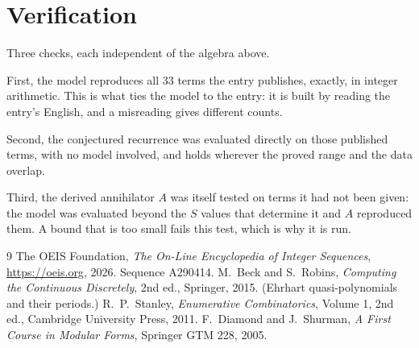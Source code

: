 \documentclass[11pt,a4paper]{article}
\theoremstyle{plain}
\theoremstyle{definition}
\begin{document}
\section{Verification}

Three checks, each independent of the algebra above.

First, the model reproduces all $33$ terms the entry publishes, exactly, in integer
arithmetic. This is what ties the model to the entry: it is built by reading the entry's
English, and a misreading gives different counts.

Second, the conjectured recurrence was evaluated directly on those published terms, with no
model involved, and holds wherever the proved range and the data overlap.

Third, the derived annihilator $A$ was itself tested on terms it had not been given: the model
was evaluated beyond the $S$ values that determine it and $A$ reproduced them. A bound that is
too small fails this test, which is why it is run.

\begin{thebibliography}{9}
 The OEIS Foundation, \emph{The On-Line Encyclopedia of Integer
Sequences}, \url{https://oeis.org}, 2026. Sequence A290414.
 M.~Beck and S.~Robins, \emph{Computing the Continuous Discretely},
2nd ed., Springer, 2015. (Ehrhart quasi-polynomials and their periods.)
 R.~P.~Stanley, \emph{Enumerative Combinatorics}, Volume 1, 2nd ed.,
Cambridge University Press, 2011.
 F.~Diamond and J.~Shurman, \emph{A First Course in Modular Forms},
Springer GTM 228, 2005.
\end{thebibliography}
\end{document}
